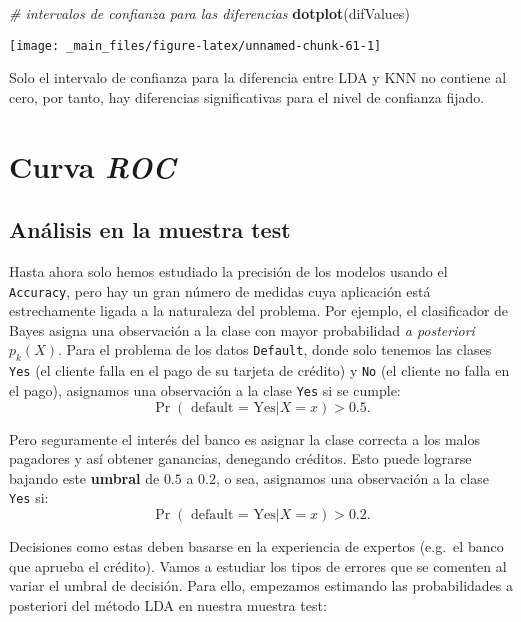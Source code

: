 \documentclass[]{book}
\newenvironment{Shaded}{\begin{snugshade}}{\end{snugshade}}
\newcommand{\CommentTok}[1]{\textcolor[rgb]{0.56,0.35,0.01}{\textit{#1}}}
\newcommand{\KeywordTok}[1]{\textcolor[rgb]{0.13,0.29,0.53}{\textbf{#1}}}
\newcommand{\NormalTok}[1]{#1}
\begin{document}
\begin{Shaded}
\begin{Highlighting}[]
\CommentTok{# intervalos de confianza para las diferencias}
\KeywordTok{dotplot}\NormalTok{(difValues)}
\end{Highlighting}
\end{Shaded}

\begin{center}\texttt{[image: \_main\_files/figure-latex/unnamed-chunk-61-1]} \end{center}

Solo el intervalo de confianza para la diferencia entre LDA y KNN no contiene al cero, por tanto, hay diferencias significativas para el nivel de confianza fijado.

\hypertarget{curva-roc}{%
\section{\texorpdfstring{Curva \emph{ROC}}{Curva ROC}}\label{curva-roc}}

\hypertarget{anuxe1lisis-en-la-muestra-test}{%
\subsection{Análisis en la muestra test}\label{anuxe1lisis-en-la-muestra-test}}

Hasta ahora solo hemos estudiado la precisión de los modelos usando el \texttt{Accuracy}, pero hay un gran número de medidas cuya aplicación está estrechamente ligada a la naturaleza del problema. Por ejemplo, el clasificador de Bayes asigna una observación a la clase con mayor probabilidad \emph{a posteriori} \(p_k(X)\). Para el problema de los datos \texttt{Default}, donde solo tenemos las clases \texttt{Yes} (el cliente falla en el pago de su tarjeta de crédito) y \texttt{No} (el cliente no falla en el pago), asignamos una observación a la clase \texttt{Yes} si se cumple: \[ \Pr (\text{ default = Yes} | X = x) > 0.5. \]

Pero seguramente el interés del banco es asignar la clase correcta a los malos pagadores y así obtener ganancias, denegando créditos. Esto puede lograrse bajando este \textbf{umbral} de \(0.5\) a \(0.2\), o sea, asignamos una observación a la clase \texttt{Yes} si: \[ \Pr (\text{ default = Yes} | X = x) > 0.2. \]

Decisiones como estas deben basarse en la experiencia de expertos (e.g.~el banco que aprueba el crédito). Vamos a estudiar los tipos de errores que se comenten al variar el umbral de decisión. Para ello, empezamos estimando las probabilidades a posteriori del método LDA en nuestra muestra test:
\end{document}
